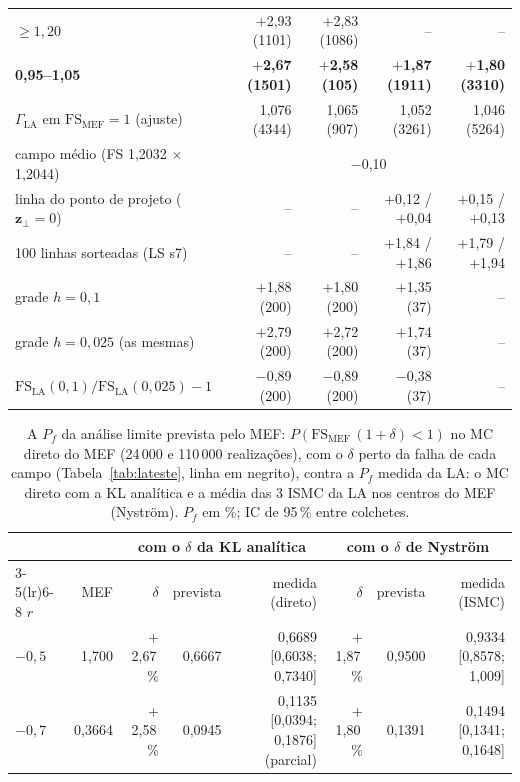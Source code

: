 \begin{table}[H]
\begin{tabular}{lrrrr}
$\ge 1{,}20$ & $+$2,93 (1101) & $+$2,83 (1086) & -- & -- \\
\textbf{0,95--1,05} & \textbf{$+$2,67 (1501)} & \textbf{$+$2,58 (105)} & \textbf{$+$1,87 (1911)} & \textbf{$+$1,80 (3310)} \\
$\Gamma_\text{LA}$ em $\mathrm{FS}_\text{MEF} = 1$ (ajuste) & 1,076 (4344) & 1,065 (907) & 1,052 (3261) & 1,046 (5264) \\\midrule
campo médio (FS 1,2032 $\times$ 1,2044) & \multicolumn{4}{c}{$-$0,10} \\
linha do ponto de projeto ($\bm z_\perp = 0$) & -- & -- & $+$0,12 / $+$0,04 & $+$0,15 / $+$0,13 \\
100 linhas sorteadas (LS s7) & -- & -- & $+$1,84 / $+$1,86 & $+$1,79 / $+$1,94 \\\midrule
grade $h = 0{,}1$ & $+$1,88 (200) & $+$1,80 (200) & $+$1,35 (37) & -- \\
grade $h = 0{,}025$ (as mesmas) & $+$2,79 (200) & $+$2,72 (200) & $+$1,74 (37) & -- \\
$\mathrm{FS}_\text{LA}(0{,}1)/\mathrm{FS}_\text{LA}(0{,}025) - 1$ & $-$0,89 (200) & $-$0,89 (200) & $-$0,38 (37) & -- \\
\bottomrule\end{tabular}\end{table}
\begin{table}[H]\centering\footnotesize\setlength{\tabcolsep}{4pt}
\caption{A $P_f$ da análise limite prevista pelo MEF: $P(\mathrm{FS}_\text{MEF}\,(1 + \delta) < 1)$ no MC direto do MEF (24\,000 e 110\,000 realizações), com o $\delta$ perto da falha de cada campo (Tabela~\ref{tab:lateste}, linha em negrito), contra a $P_f$ medida da LA: o MC direto com a KL analítica e a média das 3 ISMC da LA nos centros do MEF (Nyström). $P_f$ em \%; IC de 95\,\% entre colchetes.}\label{tab:laprev}
\begin{tabular}{lrrrrrrr}\toprule
 & & \multicolumn{3}{c}{com o $\delta$ da KL analítica} & \multicolumn{3}{c}{com o $\delta$ de Nyström} \\\cmidrule(lr){3-5}\cmidrule(lr){6-8}
$r$ & MEF & $\delta$ & prevista & medida (direto) & $\delta$ & prevista & medida (ISMC) \\\midrule
$-0{,}5$ & 1,700 & $+$2,67\,\% & 0,6667 & 0,6689 [0,6038; 0,7340] & $+$1,87\,\% & 0,9500 & 0,9334 [0,8578; 1,009] \\
$-0{,}7$ & 0,3664 & $+$2,58\,\% & 0,0945 & 0,1135 [0,0394; 0,1876] (parcial) & $+$1,80\,\% & 0,1391 & 0,1494 [0,1341; 0,1648] \\
\bottomrule\end{tabular}\end{table}
